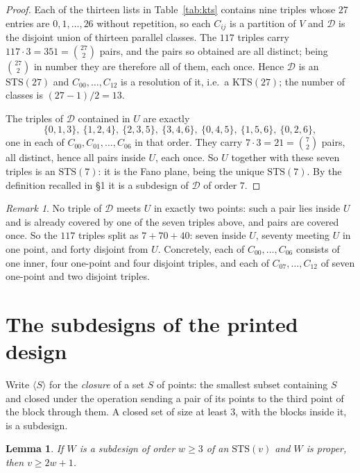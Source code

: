 \documentclass[11pt]{amsart}
\newtheorem{lemma}[theorem]{Lemma}
\theoremstyle{remark}
\newtheorem*{remark}{Remark}
\newcommand{\KTS}{\mathrm{KTS}}
\newcommand{\STS}{\mathrm{STS}}
\begin{document}
\begin{proof}
Each of the thirteen lists in Table~\ref{tab:kts} contains nine triples whose
$27$ entries are $0,1,\ldots,26$ without repetition, so each $C_{ij}$ is a
partition of $V$ and $\mathcal D$ is the disjoint union of thirteen parallel
classes. The $117$ triples carry $117\cdot 3=351=\binom{27}{2}$ pairs, and the
pairs so obtained are all distinct; being $\binom{27}{2}$ in number they are
therefore all of them, each once. Hence $\mathcal D$ is an $\STS(27)$ and
$C_{00},\ldots,C_{12}$ is a resolution of it, i.e.\ a $\KTS(27)$; the number of
classes is $(27-1)/2=13$.

The triples of $\mathcal D$ contained in $U$ are exactly
\[
 \{0,1,3\},\ \{1,2,4\},\ \{2,3,5\},\ \{3,4,6\},\ \{0,4,5\},\ \{1,5,6\},\
 \{0,2,6\},
\]
one in each of $C_{00},C_{01},\ldots,C_{06}$ in that order. They carry
$7\cdot 3=21=\binom{7}{2}$ pairs, all distinct, hence all pairs inside $U$, each
once. So $U$ together with these seven triples is an $\STS(7)$: it is the Fano
plane, being the unique $\STS(7)$. By the definition recalled in \S1 it is a
subdesign of $\mathcal D$ of order $7$.
\end{proof}

\begin{remark}
No triple of $\mathcal D$ meets $U$ in exactly two points: such a pair lies
inside $U$ and is already covered by one of the seven triples above, and pairs
are covered once. So the $117$ triples split as
$7+70+40$: seven inside $U$, seventy meeting $U$ in one point, and forty disjoint from $U$. Concretely, each of
$C_{00},\ldots,C_{06}$ consists of one inner, four one-point and four disjoint
triples, and each of $C_{07},\ldots,C_{12}$ of seven one-point and two
disjoint triples.
\end{remark}

\section{The subdesigns of the printed design}

Write $\langle S\rangle$ for the \emph{closure} of a set $S$ of points: the
smallest subset containing $S$ and closed under the operation sending a pair of
its points to the third point of the block through them. A closed set of size at
least $3$, with the blocks inside it, is a subdesign.

\begin{lemma}\label{lem:2w1}
If $W$ is a subdesign of order $w\ge 3$ of an $\STS(v)$ and $W$ is proper, then
$v\ge 2w+1$.
\end{lemma}
\end{document}
